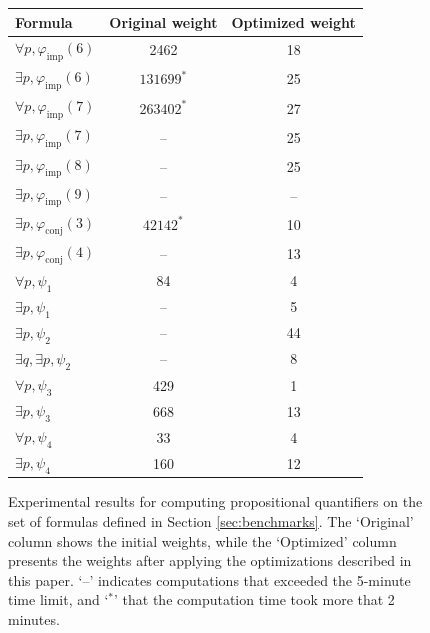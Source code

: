 \documentclass[english,review]{jflart}
\theoremstyle{definition}
\theoremstyle{plain}
\renewcommand{\phi}{\varphi}
\begin{document}
\begin{figure}[htp]
	\centering
	\begin{tabular}{|l||c|c|}
		\hline
		Formula                             & Original weight & Optimized weight \\
		\hline
		$\forall p, \phi_{\text{imp}} (6)$  & 2462            & 18               \\
		$\exists p, \phi_{\text{imp}} (6)$  & $131699^*$      & 25               \\
		$\forall p, \phi_{\text{imp}} (7)$  & $263402^*$      & 27               \\
		$\exists p, \phi_{\text{imp}} (7)$  & --              & 25               \\
		$\exists p, \phi_{\text{imp}} (8)$  & --              & 25               \\
		$\exists p, \phi_{\text{imp}} (9)$  & --              & --               \\
		$\exists p, \phi_{\text{conj}} (3)$ & $42142^*$           & 10               \\
		$\exists p, \phi_{\text{conj}} (4)$ & --              & 13               \\
		$\forall p, \psi_1$                   & 84              & 4                \\
		$\exists p, \psi_1$                   & --              & 5                \\
		$\exists p, \psi_2$                 & --              & 44               \\
		$\exists q, \exists p, \psi_2$      & --              & 8                \\
		$\forall p, \psi_3$                 & 429             & 1                \\
		$\exists p, \psi_3$                 & 668             & 13               \\
		$\forall p, \psi_4$                 & 33              & 4               \\
		$\exists p, \psi_4$                 & 160             & 12               \\
		\hline
	\end{tabular}
	\caption{Experimental results for computing propositional quantifiers on the set of formulas defined in Section \ref{sec:benchmarks}. The `Original' column shows the initial weights, while the `Optimized' column presents the weights after applying the optimizations described in this paper. `--' indicates computations that exceeded the 5-minute time limit, and `$^*$' that the computation time took more that 2 minutes.}
	\label{tab:quant-improvements}
\end{figure}
\end{document}
